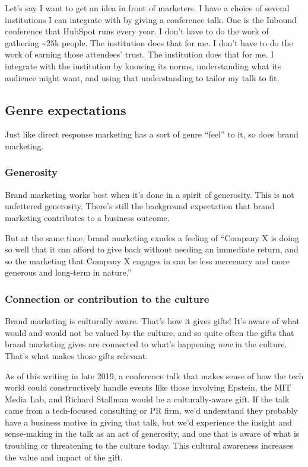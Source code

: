 \documentclass[13pt,]{tufte-handout}
\begin{document}
Let's say I want to get an idea in front of marketers. I have a choice
of several institutions I can integrate with by giving a conference
talk. One is the Inbound conference that HubSpot runs every year. I
don't have to do the work of gathering \textasciitilde{}25k people. The
institution does that for me. I don't have to do the work of earning
those attendees' trust. The institution does that for me. I integrate
with the institution by knowing its norms, understanding what its
audience might want, and using that understanding to tailor my talk to
fit.

\hypertarget{genre-expectations-1}{%
\subsection{Genre expectations}\label{genre-expectations-1}}

Just like direct response marketing has a sort of genre ``feel'' to it,
so does brand marketing.

\hypertarget{generosity}{%
\subsubsection{Generosity}\label{generosity}}

Brand marketing works best when it's done in a spirit of generosity.
This is not unfettered generosity. There's still the background
expectation that brand marketing contributes to a business outcome.

But at the same time, brand marketing exudes a feeling of ``Company X is
doing so well that it can afford to give back without needing an
immediate return, and so the marketing that Company X engages in can be
less mercenary and more generous and long-term in nature.''

\hypertarget{connection-or-contribution-to-the-culture}{%
\subsubsection{Connection or contribution to the
culture}\label{connection-or-contribution-to-the-culture}}

Brand marketing is culturally aware. That's how it gives gifts! It's
aware of what would and would not be valued by the culture, and so quite
often the gifts that brand marketing gives are connected to what's
happening \emph{now} in the culture. That's what makes those gifts
relevant.

As of this writing in late 2019, a conference talk that makes sense of
how the tech world could constructively handle events like those
involving Epstein, the MIT Media Lab, and Richard Stallman would be a
culturally-aware gift. If the talk came from a tech-focused consulting
or PR firm, we'd understand they probably have a business motive in
giving that talk, but we'd experience the insight and sense-making in
the talk as an act of generosity, and one that is aware of what is
troubling or threatening to the culture today. This cultural awareness
increases the value and impact of the gift.
\end{document}
